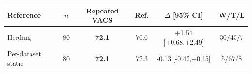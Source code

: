\begin{tabular}{lccccc}
\toprule
Reference & $n$ & Repeated VACS & Ref. & $\Delta$ [95\% CI] & W/T/L \\
\midrule
Herding & 80 & \textbf{72.1} & 70.6 & +1.54 [+0.68,+2.49] & 30/43/7 \\
Per-dataset static & 80 & \textbf{72.1} & 72.3 & -0.13 [-0.42,+0.15] & 5/67/8 \\
\bottomrule
\end{tabular}
